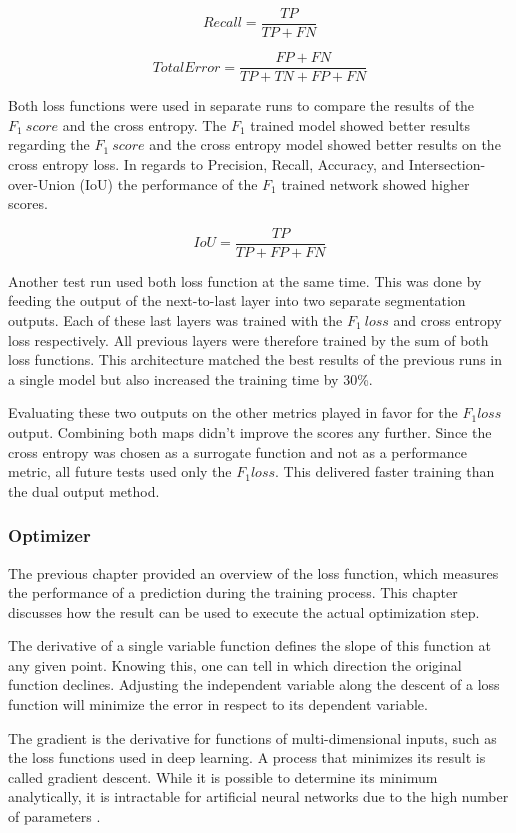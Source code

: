 \[
Recall = \frac{TP}{TP+FN}
\]

\[
Total Error = \frac{FP+FN}{TP+TN+FP+FN}
\]

Both loss functions were used in separate runs to compare the results of the $F_1 \ score$ and the cross entropy. The $F_1$ trained model showed better results regarding the $F_1 \ score$ and the cross entropy model showed better results on the cross entropy loss. In regards to Precision, Recall, Accuracy, and Intersection-over-Union (IoU) the performance of the $F_1$ trained network showed higher scores.

\[
IoU= \frac{TP}{TP+FP+FN}
\]

Another test run used both loss function at the same time. This was done by feeding the output of the next-to-last layer into two separate segmentation outputs. Each of these last layers was trained with the $F_1 \ loss$ and cross entropy loss respectively. All previous layers were therefore trained by the sum of both loss functions. This architecture matched the best results of the previous runs in a single model but also increased the training time by 30\%.

Evaluating these two outputs on the other metrics played in favor for the $F_1 loss$ output. Combining both maps didn't improve the scores any further. Since the cross entropy was chosen as a surrogate function and not as a performance metric, all future tests used only the $F_1 loss$. This delivered faster training than the dual output method.

\subsubsection{Optimizer}

The previous chapter provided an overview of the loss function, which measures the performance of a prediction during the training process. This chapter discusses how the result can be used to execute the actual optimization step.

The derivative of a single variable function defines the slope of this function at any given point. Knowing this, one can tell in which direction the original function declines. Adjusting the independent variable along the descent of a loss function will minimize the error in respect to its dependent variable.

The gradient is the derivative for functions of multi-dimensional inputs, such as the loss functions used in deep learning. A process that minimizes its result is called gradient descent. While it is possible to determine its minimum analytically, it is intractable for artificial neural networks due to the high number of parameters \cite{Chollet2017}.


